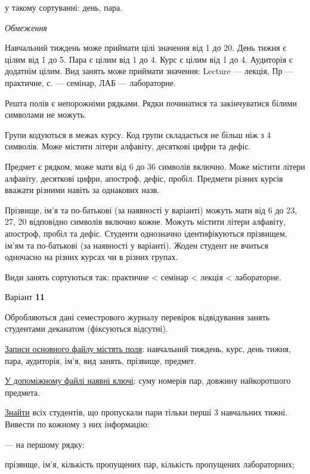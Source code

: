 \documentclass[11pt, ukrainian]{article}
\begin{document}
{\noindent}у такому сортуванні: день, пара.


\bigskip\textit{Обмеження}

Навчальний тиждень може приймати цілі значення від 1 до 20.
День тижня є цілим від 1 до 5. Пара є цілим від 1 до 4.
Курс є цілим від 1 до 4. Аудиторія є додатнім цілим.
Вид занять може приймати значення:
Lecture --- лекція, Пр --- практичне, с. --- семінар, ЛАБ --- лабораторне.

Решта полів є непорожніми рядками.
Рядки починатися та закінчуватися білими символами не можуть.

Групи кодуються в межах курсу.
Код групи складається не більш ніж з 4 символів.
Може містити літери алфавіту, десяткові цифри та дефіс.

Предмет є рядком, може мати від 6 до 36 символів включно.
Може містити літери алфавіту, десяткові цифри, апостроф, дефіс, пробіл.
Предмети різних курсів вважати різними навіть за однакових назв.

Прізвище, ім’я та по-батькові (за наявності у варіанті)
можуть мати від 6 до 23, 27, 20 відповідно символів включно кожне.
Можуть містити літери алфавіту, апостроф, пробіл та дефіс.
Студенти однозначно ідентифікуються прізвищем, ім’ям та по-батькові (за наявності у варіанті).
Жоден студент не вчиться одночасно на різних курсах чи в різних групах.

Види занять сортуються так: практичне < семінар < лекція < лабораторне.



\par
\newpage
{\center Варіант  \No \textbf { 11 }\par}
\bigskip
Обробляються дані семестрового журналу перевірок відвідування занять студентами деканатом (фіксуються відсутні). 

\underline{Записи основного файлу містять поля}: навчальний тиждень, курс, день тижня, пара, аудиторія, ім’я, вид занять, прізвище, предмет.

\underline{У допоміжному файлі наявні ключі}: суму номерів пар, довжину найкоротшого предмета.

\underline{Знайти} всіх студентів, що пропускали пари тільки перші 3 навчальних тижні. Вивести по кожному з них інформацію:\par
{\noindent}--- на першому рядку:\par
прізвище, ім’я, кількість пропущених пар, кількість пропущених лабораторних;
\end{document}
